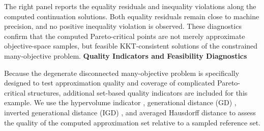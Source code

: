 \documentclass[11pt,pdflatex,sn-mathphys-ay]{sn-jnl}%
\theoremstyle{definition}
\theoremstyle{thmstyleone}%
\theoremstyle{thmstyletwo}%
\theoremstyle{thmstylethree}%
\newcommand{\add}[1]{\textcolor{revisionblue}{#1}}
\begin{document}
	The right panel reports the equality residuals and inequality violations along the computed continuation solutions. Both equality residuals remain close to machine precision, and no positive inequality violation is observed. These diagnostics confirm that the computed Pareto-critical points are not merely approximate objective-space samples, but feasible KKT-consistent solutions of the constrained many-objective problem.
	\medskip \noindent \textbf{Quality Indicators and Feasibility Diagnostics}
	
	Because the degenerate disconnected many-objective problem is specifically designed to test approximation quality and coverage of complicated Pareto-critical structures, additional set-based quality indicators are included for this example. 
	\add{We use the hypervolume indicator
		\cite{zitzler1999multiobjective}, generational
		distance (GD) \cite{vanveldhuizen1999multiobjective},
		inverted generational distance (IGD)
		\cite{ishibuchi2015modified}, and averaged
		Hausdorff distance \cite{schutze2012using}
		to assess the quality of the computed
		approximation set relative to a sampled
		reference set.}
	
\end{document}
